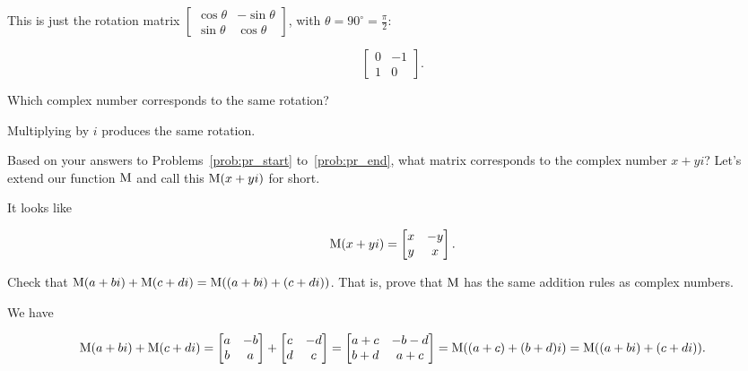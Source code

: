 \documentclass[../gatm_answers.tex]{subfiles}
\begin{document}
This is just the rotation matrix $\left[\begin{smallmatrix} \cos \theta & -\sin\theta \\ \sin\theta & \cos\theta \end{smallmatrix}\right]$, with $\theta = 90^\circ = \frac{\pi}{2}$:

$$\begin{bmatrix} 0 & -1 \\ 1 & 0 \end{bmatrix}.$$

\begin{inner_problem}
\item Which complex number corresponds to the same rotation?
\end{inner_problem}

Multiplying by $i$ produces the same rotation.

\begin{outer_problem}
\item Based on your answers to Problems~\ref{prob:pr_start} to~\ref{prob:pr_end}, what matrix corresponds to the complex number $x+yi$? Let's extend our function $\operatorname{M}$ and call this $\operatorname{M} (x+yi)$ for short.
\end{outer_problem}

It looks like

$$\operatorname{M}(x+yi) = \begin{bmatrix} x & -y \\ y & x \end{bmatrix}.$$

\begin{outer_problem}
\item Check that $\operatorname{M} (a+bi)+\operatorname{M} (c+di)=\operatorname{M}((a+bi)+(c+di))$. That is, prove that $\operatorname{M}$ has the same addition rules as complex numbers.
\end{outer_problem}

We have

$$\operatorname{M} (a+bi)+\operatorname{M} (c+di) = \begin{bmatrix} a & -b \\ b & a \end{bmatrix} + \begin{bmatrix} c & -d \\ d & c \end{bmatrix} = \begin{bmatrix} a + c & -b-d \\ b+d & a+c\end{bmatrix} = \operatorname{M}((a+c) + (b+d)i) = \operatorname{M}((a+bi)+(c+di)).$$
\end{document}
